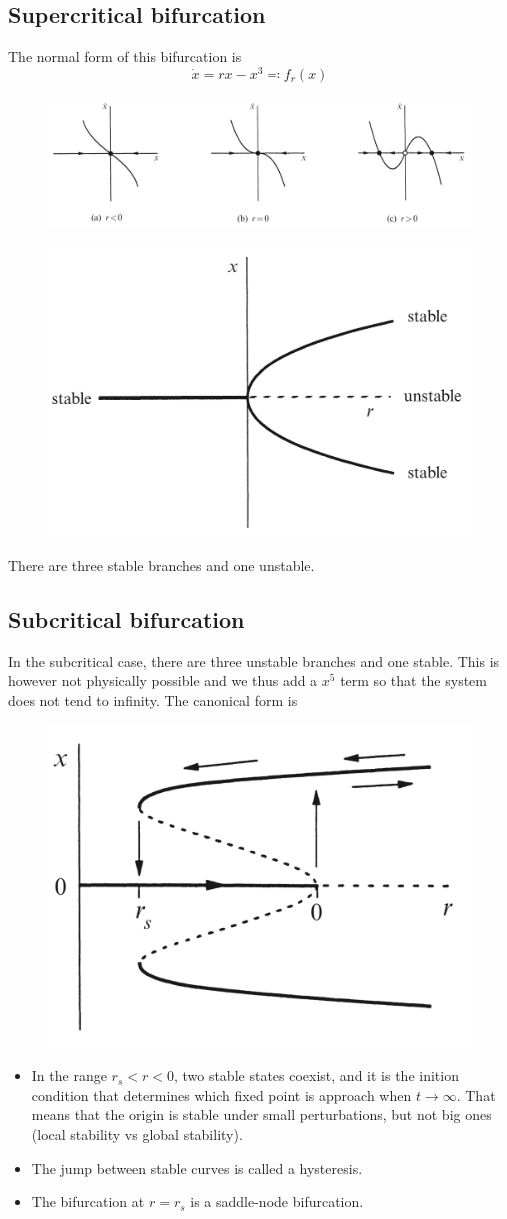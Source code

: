 \documentclass[12pt, openany]{report}
\theoremstyle{definition}
\begin{document}
\subsection{Supercritical bifurcation}
The normal form of this bifurcation is 
\begin{equation}
    \dot x = rx-x^3\eqcolon f_r(x)
\end{equation}
\begin{figure}[H]
    \centering
    \includegraphics[width = .5\textwidth]{img/pitchfork_bif.png}
\end{figure}
\begin{figure}[H]
    \centering
    \includegraphics[width = .5\textwidth]{img/supercritical.png}
\end{figure}
There are three stable branches and one unstable.
\subsection{Subcritical bifurcation}
In the subcritical case, there are three unstable branches and one stable. This is however not physically possible and we thus add a $x^5$ term so that the system does not tend to infinity. The canonical form is
\begin{figure}[H]
    \centering
    \includegraphics[width = .5\textwidth]{img/subcritical.png}
\end{figure}
\begin{itemize}
    \item In the range $r_s<r<0$, two stable states coexist, and it is the inition condition that determines which fixed point is approach when $t\rightarrow \infty$. That means that the origin is stable under small perturbations, but not big ones (local stability vs global stability). 
    \item The jump between stable curves is called a hysteresis. 
    \item The bifurcation at $r=r_s$ is a saddle-node bifurcation. 
\end{itemize}
\end{document}
